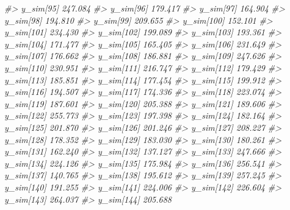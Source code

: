 \documentclass[
  10pt,
  italian,
  a4paper,
  extrafontsizes,onecolumn,openright
  ]{memoir}
\newenvironment{Shaded}{\begin{snugshade}}{\end{snugshade}}
\newcommand{\CommentTok}[1]{\textcolor[rgb]{0.56,0.35,0.01}{\textit{#1}}}
\begin{document}
\begin{Shaded}
\begin{Highlighting}[]
\CommentTok{\#\textgreater{}   y\_sim[95]  247.084}
\CommentTok{\#\textgreater{}   y\_sim[96]  179.417}
\CommentTok{\#\textgreater{}   y\_sim[97]  164.904}
\CommentTok{\#\textgreater{}   y\_sim[98]  194.810}
\CommentTok{\#\textgreater{}   y\_sim[99]  209.655}
\CommentTok{\#\textgreater{}   y\_sim[100] 152.101}
\CommentTok{\#\textgreater{}   y\_sim[101] 234.430}
\CommentTok{\#\textgreater{}   y\_sim[102] 199.089}
\CommentTok{\#\textgreater{}   y\_sim[103] 193.361}
\CommentTok{\#\textgreater{}   y\_sim[104] 171.477}
\CommentTok{\#\textgreater{}   y\_sim[105] 165.405}
\CommentTok{\#\textgreater{}   y\_sim[106] 231.649}
\CommentTok{\#\textgreater{}   y\_sim[107] 176.662}
\CommentTok{\#\textgreater{}   y\_sim[108] 186.881}
\CommentTok{\#\textgreater{}   y\_sim[109] 247.626}
\CommentTok{\#\textgreater{}   y\_sim[110] 230.951}
\CommentTok{\#\textgreater{}   y\_sim[111] 216.747}
\CommentTok{\#\textgreater{}   y\_sim[112] 179.429}
\CommentTok{\#\textgreater{}   y\_sim[113] 185.851}
\CommentTok{\#\textgreater{}   y\_sim[114] 177.454}
\CommentTok{\#\textgreater{}   y\_sim[115] 199.912}
\CommentTok{\#\textgreater{}   y\_sim[116] 194.507}
\CommentTok{\#\textgreater{}   y\_sim[117] 174.336}
\CommentTok{\#\textgreater{}   y\_sim[118] 223.074}
\CommentTok{\#\textgreater{}   y\_sim[119] 187.601}
\CommentTok{\#\textgreater{}   y\_sim[120] 205.388}
\CommentTok{\#\textgreater{}   y\_sim[121] 189.606}
\CommentTok{\#\textgreater{}   y\_sim[122] 255.773}
\CommentTok{\#\textgreater{}   y\_sim[123] 197.398}
\CommentTok{\#\textgreater{}   y\_sim[124] 182.164}
\CommentTok{\#\textgreater{}   y\_sim[125] 201.870}
\CommentTok{\#\textgreater{}   y\_sim[126] 201.246}
\CommentTok{\#\textgreater{}   y\_sim[127] 208.227}
\CommentTok{\#\textgreater{}   y\_sim[128] 178.352}
\CommentTok{\#\textgreater{}   y\_sim[129] 183.030}
\CommentTok{\#\textgreater{}   y\_sim[130] 180.261}
\CommentTok{\#\textgreater{}   y\_sim[131] 162.240}
\CommentTok{\#\textgreater{}   y\_sim[132] 137.127}
\CommentTok{\#\textgreater{}   y\_sim[133] 247.666}
\CommentTok{\#\textgreater{}   y\_sim[134] 224.126}
\CommentTok{\#\textgreater{}   y\_sim[135] 175.984}
\CommentTok{\#\textgreater{}   y\_sim[136] 256.541}
\CommentTok{\#\textgreater{}   y\_sim[137] 140.765}
\CommentTok{\#\textgreater{}   y\_sim[138] 195.612}
\CommentTok{\#\textgreater{}   y\_sim[139] 257.245}
\CommentTok{\#\textgreater{}   y\_sim[140] 191.255}
\CommentTok{\#\textgreater{}   y\_sim[141] 224.006}
\CommentTok{\#\textgreater{}   y\_sim[142] 226.604}
\CommentTok{\#\textgreater{}   y\_sim[143] 264.037}
\CommentTok{\#\textgreater{}   y\_sim[144] 205.688}

\end{Highlighting}
\end{Shaded}
\end{document}
